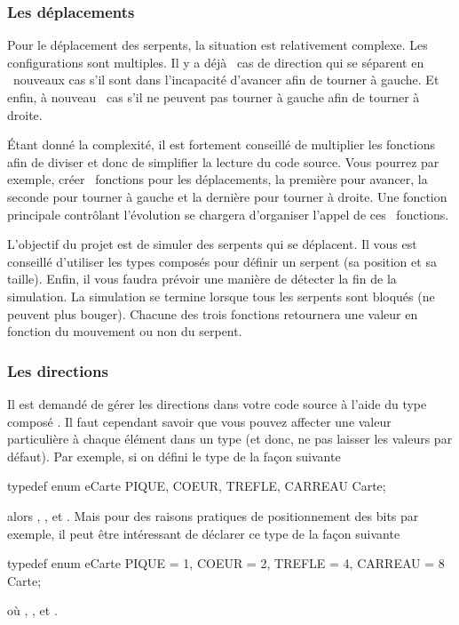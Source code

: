 \documentclass[a4paper]{article}
\begin{document}
			\subsubsection{Les déplacements}
				Pour le déplacement des serpents, la situation est relativement complexe.
				Les configurations sont multiples.
				Il y a déjà ~cas de direction qui se séparent en ~nouveaux cas s'il sont dans l'incapacité d'avancer afin de tourner à gauche.
				Et enfin, à nouveau ~cas s'il ne peuvent pas tourner à gauche afin de tourner à droite.
				
				Étant donné la complexité, il est fortement conseillé de multiplier les fonctions afin de diviser et donc de simplifier la lecture du code source.
				Vous pourrez par exemple, créer ~fonctions pour les déplacements, la première pour avancer, la seconde pour tourner à gauche et la dernière pour tourner à droite.
				Une fonction principale contrôlant l'évolution se chargera d'organiser l'appel de ces ~fonctions.

				L'objectif du projet est de simuler des serpents qui se déplacent.
				Il vous est conseillé d'utiliser les types composés  pour définir un serpent (sa position et sa taille).
				Enfin, il vous faudra prévoir une manière de détecter la fin de la simulation.
				La simulation se termine lorsque tous les serpents sont bloqués (\ie ne peuvent plus bouger).
				Chacune des trois fonctions retournera une valeur en fonction du mouvement ou non du serpent.

			\subsubsection{Les directions}
				Il est demandé de gérer les directions dans votre code source à l'aide du type composé .
				Il faut cependant savoir que vous pouvez affecter une valeur particulière à chaque élément dans un type  (et donc, ne pas laisser les valeurs par défaut).
				Par exemple, si on défini le type  de la façon suivante
				\begin{Code*}
typedef enum eCarte
{
	PIQUE,
	COEUR,
	TREFLE,
	CARREAU
} Carte;
				\end{Code*}
				alors , ,  et .
				Mais pour des raisons pratiques de positionnement des bits par exemple, il peut être intéressant de déclarer ce type de la façon suivante
				\begin{Code*}
typedef enum eCarte
{
	PIQUE = 1,
	COEUR = 2,
	TREFLE = 4,
	CARREAU = 8
} Carte;
				\end{Code*}
				où , ,  et .
\end{document}
